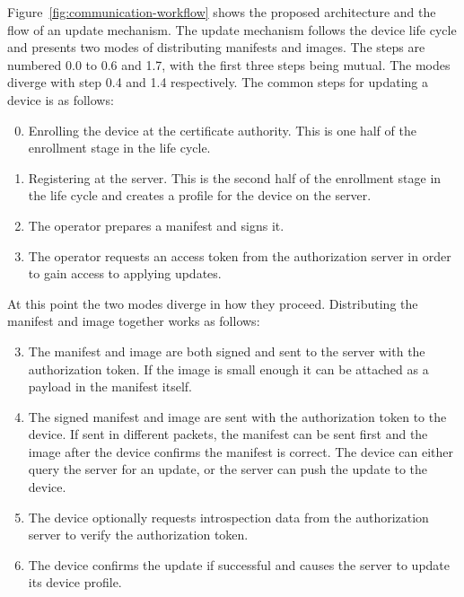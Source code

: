 \documentclass[0-thesis.tex]{subfiles}
\begin{document}
Figure~\ref{fig:communication-workflow} shows the proposed architecture and the flow of an update
mechanism. The update mechanism follows the device life cycle and presents two modes of
distributing manifests and images. The steps are numbered 0.0 to 0.6 and 1.7, with the
first three steps being mutual. The modes diverge with step 0.4 and 1.4 respectively. The
common steps for updating a device is as follows:

\begin{enumerate}[label=0.\arabic*]
    \setcounter{enumi}{-1}
    \item Enrolling the device at the certificate authority. This is one half of the
            enrollment stage in the life cycle.
    \item Registering at the server. This is the second half of the enrollment stage
            in the life cycle and creates a profile for the device on the server.
    \item The operator prepares a manifest and signs it.
    \item The operator requests an access token from the authorization server in order to
            gain access to applying updates.
\end{enumerate}

At this point the two modes diverge in how they proceed. Distributing the manifest and
image together works as follows:

\begin{enumerate}[label=0.\arabic*]
    \setcounter{enumi}{2}
    \item The manifest and image are both signed and sent to the server with the
            authorization token. If the image is small enough it can be attached as a
            payload in the manifest itself.
    \item The signed manifest and image are sent with the authorization token to the
            device. If sent in different packets, the manifest can be sent first and the
            image after the device confirms the manifest is correct. The device can either
            query the server for an update, or the server can push the update to the
            device.
    \item The device optionally requests introspection data from the authorization server
            to verify the authorization token.
    \item The device confirms the update if successful and causes the server to update
            its device profile.
\end{enumerate}
\end{document}

